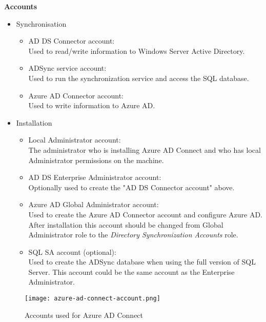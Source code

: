 \textbf{Accounts} 
\begin{itemize}
\item Synchronisation
	\begin{itemize}
	\item AD DS Connector account: \\ Used to read/write information to Windows Server Active Directory.
	\item ADSync service account: \\ Used to run the synchronization service and access the SQL database.
	\item Azure AD Connector account: \\ Used to write information to Azure AD.
	\end{itemize}
\item Installation
	\begin{itemize}
	\item Local Administrator account: \\ The administrator who is installing Azure AD Connect and who has local Administrator permissions on the machine.
	\item AD DS Enterprise Administrator account: \\ Optionally used to create the "AD DS Connector account" above.
	\item Azure AD Global Administrator account: \\ Used to create the Azure AD Connector account and configure Azure AD. \\ After installation this account should be changed from Global Administrator role to the \textit{Directory Synchronization Accounts} role.
	\item SQL SA account (optional): \\ Used to create the ADSync database when using the full version of SQL Server. This account could be the same account as the Enterprise Administrator. 
	\end{itemize}
\end{itemize}
\begin{figure}[!h]
\texttt{[image: azure-ad-connect-account.png]}
\caption{Accounts used for Azure AD Connect}
\label{fig:azure-connect-accounts}
\end{figure}

